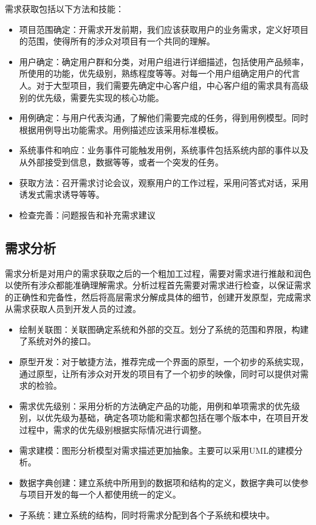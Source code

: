 \documentclass[UTF8,nofonts]{ctexart}
\begin{document}
需求获取包括以下方法和技能：
\begin{itemize}
 \setlength{\itemsep}{0pt}
 \setlength{\parskip}{0pt}
 \setlength{\parsep}{0pt}
\item 项目范围确定：开需求开发前期，我们应该获取用户的业务需求，定义好项目的范围，使得所有的涉众对项目有一个共同的理解。
\item 用户确定：确定用户群和分类，对用户组进行详细描述，包括使用产品频率，所使用的功能，优先级别，熟练程度等等。对每一个用户组确定用户的代言人。对于大型项目，我们需要先确定中心客户组，中心客户组的需求具有高级别的优先级，需要先实现的核心功能。
\item 用例确定：与用户代表沟通，了解他们需要完成的任务，得到用例模型。同时根据用例导出功能需求。用例描述应该采用标准模板。
\item 系统事件和响应：业务事件可能触发用例，系统事件包括系统内部的事件以及从外部接受到信息，数据等等，或者一个突发的任务。
\item 获取方法：召开需求讨论会议，观察用户的工作过程，采用问答式对话，采用诱发式需求诱导等等。
\item 检查完善：问题报告和补充需求建议
\end{itemize}
\subsection{\textbf{需求分析}}
需求分析是对用户的需求获取之后的一个粗加工过程，需要对需求进行推敲和润色以使所有涉众都能准确理解需求。分析过程首先需要对需求进行检查，以保证需求的正确性和完备性，然后将高层需求分解成具体的细节，创建开发原型，完成需求从需求获取人员到开发人员的过渡。
\begin{itemize}
 \setlength{\itemsep}{0pt}
 \setlength{\parskip}{0pt}
 \setlength{\parsep}{0pt}
\item 绘制关联图：关联图确定系统和外部的交互。划分了系统的范围和界限，构建了系统对外的接口。
\item	原型开发：对于敏捷方法，推荐完成一个界面的原型，一个初步的系统实现，通过原型，让所有涉众对开发的项目有了一个初步的映像，同时可以提供对需求的检验。
\item	需求优先级别：采用分析的方法确定产品的功能，用例和单项需求的优先级别，以优先级为基础，确定各项功能和需求都包括在哪个版本中，在项目开发过程中，需求的优先级别根据实际情况进行调整。
\item	需求建模：图形分析模型对需求描述更加抽象。主要可以采用UML的建模分析。
\item	数据字典创建：建立系统中所用到的数据项和结构的定义，数据字典可以使参与项目开发的每一个人都使用统一的定义。
\item	子系统：建立系统的结构，同时将需求分配到各个子系统和模块中。
\end{itemize}
\end{document}
